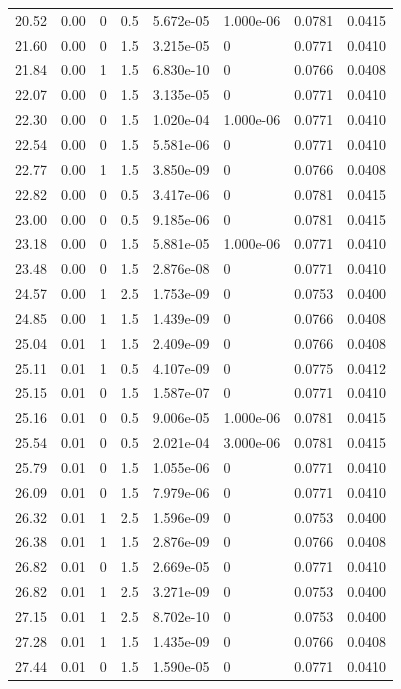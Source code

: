 \documentclass[preview]{standalone}
\begin{document}
{{{\begin{tabular}{L{1.2cm}C{1.2cm} C{0.3cm}C{0.5cm} C{1.4cm}C{1.4cm} C{1.4cm}C{1.4cm}}
  20.52  &  0.00  & 0     & 0.5 &  5.672e-05  & 1.000e-06  & 0.0781 &  0.0415   \\ 
  21.60  &  0.00  & 0     & 1.5 &  3.215e-05  & 0  & 0.0771 &  0.0410   \\ 
  21.84  &  0.00  & 1     & 1.5 &  6.830e-10  & 0  & 0.0766 &  0.0408   \\ 
  22.07  &  0.00  & 0     & 1.5 &  3.135e-05  & 0  & 0.0771 &  0.0410   \\ 
  22.30  &  0.00  & 0     & 1.5 &  1.020e-04  & 1.000e-06  & 0.0771 &  0.0410   \\ 
  22.54  &  0.00  & 0     & 1.5 &  5.581e-06  & 0  & 0.0771 &  0.0410   \\ 
  22.77  &  0.00  & 1     & 1.5 &  3.850e-09  & 0  & 0.0766 &  0.0408   \\ 
  22.82  &  0.00  & 0     & 0.5 &  3.417e-06  & 0  & 0.0781 &  0.0415   \\ 
  23.00  &  0.00  & 0     & 0.5 &  9.185e-06  & 0  & 0.0781 &  0.0415   \\ 
  23.18  &  0.00  & 0     & 1.5 &  5.881e-05  & 1.000e-06  & 0.0771 &  0.0410   \\ 
  23.48  &  0.00  & 0     & 1.5 &  2.876e-08  & 0  & 0.0771 &  0.0410   \\ 
  24.57  &  0.00  & 1     & 2.5 &  1.753e-09  & 0  & 0.0753 &  0.0400   \\ 
  24.85  &  0.00  & 1     & 1.5 &  1.439e-09  & 0  & 0.0766 &  0.0408   \\ 
  25.04  &  0.01  & 1     & 1.5 &  2.409e-09  & 0  & 0.0766 &  0.0408   \\ 
  25.11  &  0.01  & 1     & 0.5 &  4.107e-09  & 0  & 0.0775 &  0.0412   \\ 
  25.15  &  0.01  & 0     & 1.5 &  1.587e-07  & 0  & 0.0771 &  0.0410   \\ 
  25.16  &  0.01  & 0     & 0.5 &  9.006e-05  & 1.000e-06  & 0.0781 &  0.0415   \\ 
  25.54  &  0.01  & 0     & 0.5 &  2.021e-04  & 3.000e-06  & 0.0781 &  0.0415   \\ 
  25.79  &  0.01  & 0     & 1.5 &  1.055e-06  & 0  & 0.0771 &  0.0410   \\ 
  26.09  &  0.01  & 0     & 1.5 &  7.979e-06  & 0  & 0.0771 &  0.0410   \\ 
  26.32  &  0.01  & 1     & 2.5 &  1.596e-09  & 0  & 0.0753 &  0.0400   \\ 
  26.38  &  0.01  & 1     & 1.5 &  2.876e-09  & 0  & 0.0766 &  0.0408   \\ 
  26.82  &  0.01  & 0     & 1.5 &  2.669e-05  & 0  & 0.0771 &  0.0410   \\ 
  26.82  &  0.01  & 1     & 2.5 &  3.271e-09  & 0  & 0.0753 &  0.0400   \\ 
  27.15  &  0.01  & 1     & 2.5 &  8.702e-10  & 0  & 0.0753 &  0.0400   \\ 
  27.28  &  0.01  & 1     & 1.5 &  1.435e-09  & 0  & 0.0766 &  0.0408   \\ 
  27.44  &  0.01  & 0     & 1.5 &  1.590e-05  & 0  & 0.0771 &  0.0410   \\ 
\hline 
\end{tabular} 

}}}
\end{document}
